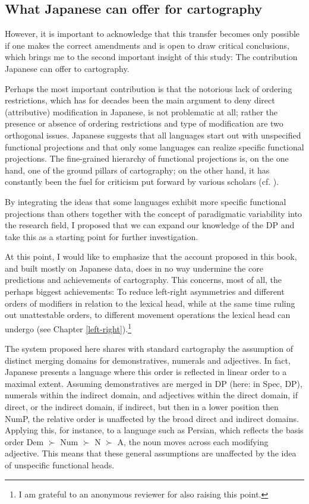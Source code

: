 \documentclass [output=book,colorlinks,citecolor=brown]{langscibook}
\begin{document}
\subsection{What Japanese can offer for cartography} \label{discussion u20}

However, it is important to acknowledge that this transfer becomes only possible if one makes the correct amendments and is open to draw critical conclusions, which brings me to the second important insight of this study: The contribution Japanese can offer to cartography.

Perhaps the most important contribution is that the notorious lack of ordering restrictions, which has for decades been the main argument to deny direct (attributive) modification in Japanese, is not problematic at all; rather the presence or absence of ordering restrictions and type of modification are two orthogonal issues. Japanese suggests that all languages start out with unspecified functional projections and that only some languages can realize specific functional projections. The fine-grained hierarchy of functional projections is, on the one hand, one of the ground pillars of cartography; on the other hand, it has constantly been the fuel for criticism put forward by various scholars (cf. \citealt{larson:2021:rethinking}).

By integrating the ideas that some languages exhibit more specific functional projections than others together with the concept of paradigmatic variability into the research field, I proposed that we can expand our knowledge of the DP and take this as a starting point for further investigation.

At this point, I would like to emphasize that the account proposed in this book, and built mostly on Japanese data, does in no way undermine the core predictions and achievements of cartography. This concerns, most of all, the perhaps biggest achievements: To reduce left-right asymmetries and different orders of modifiers in relation to the lexical head, while at the same time ruling out unattestable \citep{cinque:2025:superiority} orders, to different movement operations the lexical head can undergo (see Chapter \ref{left-right}).\footnote{I am grateful to an anonymous reviewer for also raising this point.}

The system proposed here shares with standard cartography the assumption of distinct merging domains for demonstratives, numerals and adjectives. In fact, Japanese presents a language where this order is reflected in linear order to a maximal extent. Assuming demonstratives are merged in DP (here: in Spec, DP), numerals within the indirect domain, and adjectives within the direct domain, if direct, or the indirect domain, if indirect, but then in a lower position then NumP, the relative order is unaffected by the broad direct and indirect domains. Applying this, for instance, to a language such as Persian, which reflects the basis order Dem $\succ$ Num $\succ$ N $\succ$ A, the noun moves across each modifying adjective. This means that these general assumptions are unaffected by the idea of unspecific functional heads.
\end{document}
